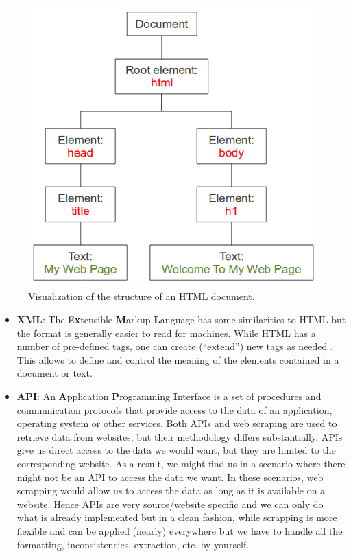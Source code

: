 \documentclass[
]{book}
\begin{document}
\begin{figure}
\includegraphics[width=7.92in]{./figures/node-tree} \caption{Visualization of the structure of an HTML document.}\label{fig:node-tree}
\end{figure}

\begin{itemize}
\item
  \textbf{XML}: The E\textbf{x}tensible \textbf{M}arkup \textbf{L}anguage has some similarities to HTML but the format is generally easier to read for machines. While HTML has a number of pre-defined tags, one can create (``extend'') new tags as needed . This allows to define and control the meaning of the elements contained in a document or text.
\item
  \textbf{API}: An \textbf{A}pplication \textbf{P}rogramming \textbf{I}nterface is a set of procedures and communication protocols that provide access to the data of an application, operating system or other services. Both APIs and web scraping are used to retrieve data from websites, but their methodology differs substantially. APIs give us direct access to the data we would want, but they are limited to the corresponding website. As a result, we might find us in a scenario where there might not be an API to access the data we want. In these scenarios, web scrapping would allow us to access the data as long as it is available on a website. Hence APIs are very source/website specific and we can only do what is already implemented but in a clean fashion, while scrapping is more flexible and can be applied (nearly) everywhere but we have to handle all the formatting, inconsistencies, extraction, etc. by yourself.
\end{itemize}
\end{document}
